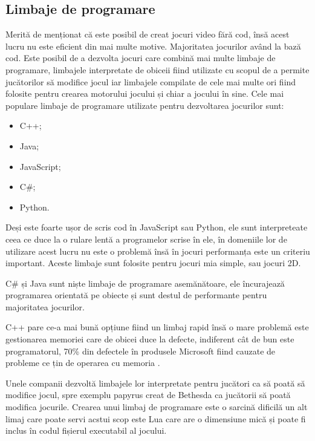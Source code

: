 \subsection{Limbaje de programare}
Merită de menționat că este posibil de creat jocuri video fără cod, însă acest lucru nu este eficient din mai multe motive. Majoritatea jocurilor având la bază cod. Este posibil de a dezvolta jocuri care combină mai multe limbaje de programare, limbajele interpretate de obiceii fiind utilizate cu scopul de a permite jucătorilor să modifice jocul iar limbajele compilate de cele mai multe ori fiind folosite pentru crearea motorului jocului și chiar a jocului în sine. Cele mai populare limbaje de programare utilizate pentru dezvoltarea jocurilor sunt:
\begin{itemize}
    \item C++;
    \item Java;
    \item JavaScript;
    \item C\#;
    \item Python.
\end{itemize}

Deși este foarte ușor de scris cod în JavaScript sau Python, ele sunt interpreteate ceea ce duce la o rulare lentă a programelor scrise în ele, în domeniile lor de utilizare acest lucru nu este o problemă însă în jocuri performanța este un criteriu important. Aceste limbaje sunt folosite pentru jocuri mia simple, sau jocuri 2D.

C\# și Java sunt niște limbaje de programare asemănătoare, ele încurajează programarea orientată pe obiecte și sunt destul de performante pentru majoritatea jocurilor.

C++ pare ce-a mai bună opțiune fiind un limbaj rapid însă o mare problemă este gestionarea memoriei care de obicei duce la defecte, indiferent cât de bun este programatorul, 70\% din defectele în produsele Microsoft fiind cauzate de probleme ce țin de operarea cu memoria \cite{WinBugs}.

Unele companii dezvoltă limbajele lor interpretate pentru jucători ca să poată să modifice jocul, spre exemplu papyrus creat de Bethesda ca jucătorii să poată modifica jocurile. Crearea unui limbaj de programare este o sarcină dificilă un alt limaj care poate servi acstui scop este Lua \cite{Lua} care are o dimensiune mică și poate fi inclus în codul fișierul executabil al jocului.

